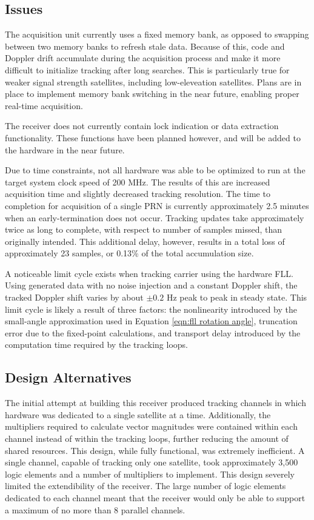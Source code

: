 \documentclass[12pt]{article}
\begin{document}
\subsection{Issues}
The acquisition unit currently uses a fixed memory bank, as opposed to swapping between two memory banks to refresh stale data. Because of this, code and Doppler drift accumulate during the acquisition process and make it more difficult to initialize tracking after long searches. This is particularly true for weaker signal strength satellites, including low-eleveation satellites. Plans are in place to implement memory bank switching in the near future, enabling proper real-time acquisition.

The receiver does not currently contain lock indication or data extraction functionality. These functions have been planned however, and will be added to the hardware in the near future.

Due to time constraints, not all hardware was able to be optimized to run at the target system clock speed of 200 MHz. The results of this are increased acquisition time and slightly decreased tracking resolution. The time to completion for acquisition of a single PRN is currently approximately 2.5 minutes when an early-termination does not occur. Tracking updates take approximately twice as long to complete, with respect to number of samples missed, than originally intended. This additional delay, however, results in a total loss of approximately 23 samples, or 0.13\% of the total accumulation size.

A noticeable limit cycle exists when tracking carrier using the hardware FLL. Using generated data with no noise injection and a constant Doppler shift, the tracked Doppler shift varies by about $\pm 0.2$ Hz peak to peak in steady state. This limit cycle is likely a result of three factors: the nonlinearity introduced by the small-angle approximation used in Equation \ref{eqn:fll rotation angle}, truncation error due to the fixed-point calculations, and transport delay introduced by the computation time required by the tracking loops.

\subsection{Design Alternatives}
The initial attempt at building this receiver produced tracking channels in which hardware was dedicated to a single satellite at a time. Additionally, the multipliers required to calculate vector magnitudes were contained within each channel instead of within the tracking loops, further reducing the amount of shared resources. This design, while fully functional, was extremely inefficient. A single channel, capable of tracking only one satellite, took approximately 3,500 logic elements and a number of multipliers to implement. This design severely limited the extendibility of the receiver. The large number of logic elements dedicated to each channel meant that the receiver would only be able to support a maximum of no more than 8 parallel channels.
\end{document}
